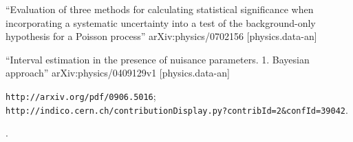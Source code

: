 \begin{thebibliography}{99}
 {``Evaluation of three methods for calculating statistical significance when incorporating a systematic uncertainty into a test of the background-only hypothesis for a Poisson process''} arXiv:physics/0702156 [physics.data-an]

 {``Interval estimation in the presence of nuisance parameters. 1. Bayesian approach''} arXiv:physics/0409129v1 [physics.data-an]



 {\tt http://arxiv.org/pdf/0906.5016}; \\
{\tt http://indico.cern.ch/contributionDisplay.py?contribId=2\&confId=39042}.

.


\end{thebibliography}
